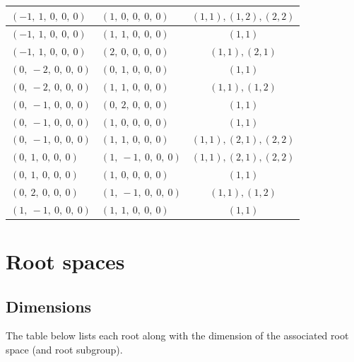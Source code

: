 \documentclass[11pt]{article}
\theoremstyle{definition}
\begin{document}
\begin{tabular}{|l|l|c|}
    \hline
    $\left( -1, \  1, \  0, \  0, \  0\right)$ & $\left( 1, \  0, \  0, \  0, \  0\right)$ & $(1,1), (1,2), (2,2)$ \\
    \hline
    $\left( -1, \  1, \  0, \  0, \  0\right)$ & $\left( 1, \  1, \  0, \  0, \  0\right)$ & $(1,1)$ \\
    \hline
    $\left( -1, \  1, \  0, \  0, \  0\right)$ & $\left( 2, \  0, \  0, \  0, \  0\right)$ & $(1,1), (2,1)$ \\
    \hline
    $\left( 0, \  -2, \  0, \  0, \  0\right)$ & $\left( 0, \  1, \  0, \  0, \  0\right)$ & $(1,1)$ \\
    \hline
    $\left( 0, \  -2, \  0, \  0, \  0\right)$ & $\left( 1, \  1, \  0, \  0, \  0\right)$ & $(1,1), (1,2)$ \\
    \hline
    $\left( 0, \  -1, \  0, \  0, \  0\right)$ & $\left( 0, \  2, \  0, \  0, \  0\right)$ & $(1,1)$ \\
    \hline
    $\left( 0, \  -1, \  0, \  0, \  0\right)$ & $\left( 1, \  0, \  0, \  0, \  0\right)$ & $(1,1)$ \\
    \hline
    $\left( 0, \  -1, \  0, \  0, \  0\right)$ & $\left( 1, \  1, \  0, \  0, \  0\right)$ & $(1,1), (2,1), (2,2)$ \\
    \hline
    $\left( 0, \  1, \  0, \  0, \  0\right)$ & $\left( 1, \  -1, \  0, \  0, \  0\right)$ & $(1,1), (2,1), (2,2)$ \\
    \hline
    $\left( 0, \  1, \  0, \  0, \  0\right)$ & $\left( 1, \  0, \  0, \  0, \  0\right)$ & $(1,1)$ \\
    \hline
    $\left( 0, \  2, \  0, \  0, \  0\right)$ & $\left( 1, \  -1, \  0, \  0, \  0\right)$ & $(1,1), (1,2)$ \\
    \hline
    $\left( 1, \  -1, \  0, \  0, \  0\right)$ & $\left( 1, \  1, \  0, \  0, \  0\right)$ & $(1,1)$ \\
    \hline
\end{tabular}


\newpage
\section{Root spaces}

\subsection{Dimensions}

The table below lists each root along with the dimension of the associated root space (and root subgroup).
\end{document}
